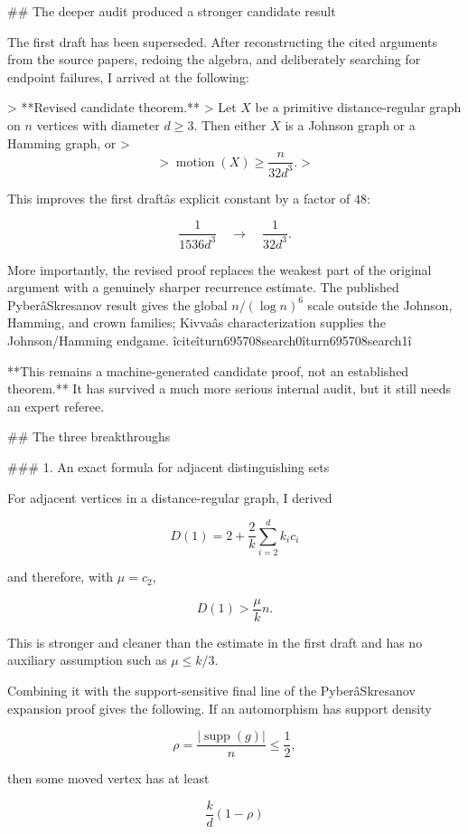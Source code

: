 ## The deeper audit produced a stronger candidate result

The first draft has been superseded. After reconstructing the cited arguments from the source papers, redoing the algebra, and deliberately searching for endpoint failures, I arrived at the following:

> **Revised candidate theorem.**  
> Let \(X\) be a primitive distance-regular graph on \(n\) vertices with diameter \(d\ge3\). Then either \(X\) is a Johnson graph or a Hamming graph, or
> \[
> \boxed{\operatorname{motion}(X)\ge \frac{n}{32d^{3}}.}
> \]

This improves the first draftâs explicit constant by a factor of \(48\):

\[
\frac{1}{1536d^{3}}
\quad\longrightarrow\quad
\frac{1}{32d^{3}}.
\]

More importantly, the revised proof replaces the weakest part of the original argument with a genuinely sharper recurrence estimate. The published PyberâSkresanov result gives the global \(n/(\log n)^6\) scale outside the Johnson, Hamming, and crown families; Kivvaâs characterization supplies the Johnson/Hamming endgame. îciteîturn695708search0îturn695708search1î

**This remains a machine-generated candidate proof, not an established theorem.** It has survived a much more serious internal audit, but it still needs an expert referee.

## The three breakthroughs

### 1. An exact formula for adjacent distinguishing sets

For adjacent vertices in a distance-regular graph, I derived

\[
\boxed{
D(1)=2+\frac{2}{k}\sum_{i=2}^{d}k_i c_i
}
\]

and therefore, with \(\mu=c_2\),

\[
\boxed{
D(1)>\frac{\mu}{k}n.
}
\]

This is stronger and cleaner than the estimate in the first draft and has no auxiliary assumption such as \(\mu\le k/3\).

Combining it with the support-sensitive final line of the PyberâSkresanov expansion proof gives the following. If an automorphism has support density

\[
\rho=\frac{|\operatorname{supp}(g)|}{n}\le\frac12,
\]

then some moved vertex has at least

\[
\frac{k}{d}(1-\rho)
\]

